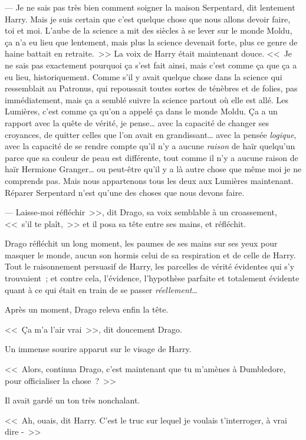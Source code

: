 --- Je ne sais pas très bien comment soigner la maison Serpentard, dit lentement Harry. Mais je suis certain que c'est quelque chose que nous allons devoir faire, toi et moi. L'aube de la science a mit des siècles à se lever sur le monde Moldu, ça n'a eu lieu que lentement, mais plus la science devenait forte, plus ce genre de haine battait en retraite.~>> La voix de Harry était maintenant douce. <<~Je ne sais pas exactement pourquoi ça s'est fait ainsi, mais c'est comme ça que ça a eu lieu, historiquement. Comme s'il y avait quelque chose dans la science qui ressemblait au Patronus, qui repoussait toutes sortes de ténèbres et de folies, pas immédiatement, mais ça a semblé suivre la science partout où elle est allé. Les Lumières, c'est comme ça qu'on a appelé ça dans le monde Moldu. Ça a un rapport avec la quête de vérité, je pense… avec la capacité de changer ses croyances, de quitter celles que l'on avait en grandissant… avec la pensée \emph{logique}, avec la capacité de se rendre compte qu'il n'y a aucune \emph{raison} de haïr quelqu'un parce que sa couleur de peau est différente, tout comme il n'y a aucune raison de haïr Hermione Granger… ou peut-être qu'il y a là autre chose que même moi je ne comprends pas. Mais nous appartenons tous les deux aux Lumières maintenant. Réparer Serpentard n'est qu'une des choses que nous devons faire.

--- Laisse-moi réfléchir~>>, dit Drago, sa voix semblable à un croassement, <<~s'il te plaît,~>> et il posa sa tête entre ses mains, et réfléchit.

\later

Drago réfléchit un long moment, les paumes de ses mains sur ses yeux pour masquer le monde, aucun son hormis celui de sa respiration et de celle de Harry. Tout le raisonnement persuasif de Harry, les parcelles de vérité évidentes qui s'y trouvaient~; et contre cela, l'évidence, l'hypothèse parfaite et totalement évidente quant à ce qui était en train de se passer \emph{réellement}…

Après un moment, Drago releva enfin la tête.

<<~Ça m'a l'air vrai~>>, dit doucement Drago.

Un immense sourire apparut sur le visage de Harry.

<<~Alors, continua Drago, c'est maintenant que tu m'amènes à Dumbledore, pour officialiser la chose~?~>>

Il avait gardé un ton très nonchalant.

<<~Ah, ouais, dit Harry. C'est le truc sur lequel je voulais t'interroger, à vrai dire -~>>

